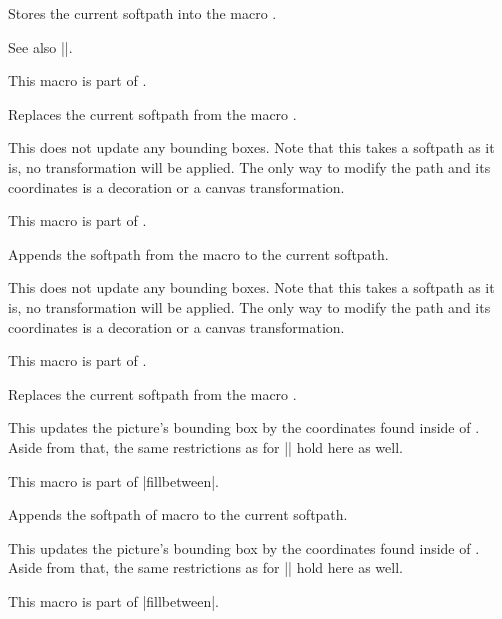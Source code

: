 \begin{command}{\pgfgetpath{}}
    Stores the current softpath into the macro .

    See also |\tikzgetnamedpath|.

    This macro is part of \pgfname{}.
\end{command}

\begin{command}{\pgfsetpath{}}
    Replaces the current softpath from the macro .

    This does not update any bounding boxes. Note that this takes a softpath as
    it is, no transformation will be applied. The only way to modify the path
    and its coordinates is a decoration or a canvas transformation.

    This macro is part of \pgfname{}.
\end{command}
\begin{command}{\pgfaddpath{}}
    Appends the softpath from the macro  to
    the current softpath.

    This does not update any bounding boxes. Note that this takes a softpath as
    it is, no transformation will be applied. The only way to modify the path
    and its coordinates is a decoration or a canvas transformation.

    This macro is part of \pgfname{}.
\end{command}

\begin{command}{\pgfsetpathandBB{}}
    Replaces the current softpath from the macro .

    This updates the picture's bounding box by the coordinates found inside of
    . Aside from that, the same restrictions
    as for |\pgfsetpath| hold here as well.

    This macro is part of |fillbetween|.
\end{command}

\begin{command}{\pgfaddpathandBB{}}
    Appends the softpath of macro  to the
    current softpath.

    This updates the picture's bounding box by the coordinates found inside of
    . Aside from that, the same restrictions
    as for |\pgfsetpath| hold here as well.

    This macro is part of |fillbetween|.
\end{command}

